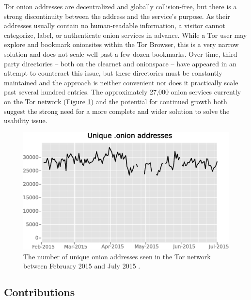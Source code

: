 \documentclass[USenglish,oneside,twocolumn]{article}
\begin{document}
Tor onion addresses are decentralized and globally collision-free, but there is a strong discontinuity between the address and the service's purpose. As their addresses usually contain no human-readable information, a visitor cannot categorize, label, or authenticate onion services in advance. While a Tor user may explore and bookmark onionsites within the Tor Browser, this is a very narrow solution and does not scale well past a few dozen bookmarks. Over time, third-party directories -- both on the clearnet and onionspace -- have appeared in an attempt to counteract this issue, but these directories must be constantly maintained and the approach is neither convenient nor does it practically scale past several hundred entries. The approximately 27,000 onion services currently on the Tor network (Figure \ref{fig:OnionCount}) and the potential for continued growth both suggest the strong need for a more complete and wider solution to solve the usability issue.

\begin{figure}[htbp]
	\centering
	\includegraphics[width=\linewidth]{../assets/images/Tor/onion_2015-02_2015-07.eps}
	\caption{The number of unique onion addresses seen in the Tor network between February 2015 and July 2015 \cite{kadianakis2015extrapolating, TorMetrics}.}
	\label{fig:OnionCount}
\end{figure}

\subsection{Contributions}
\end{document}

